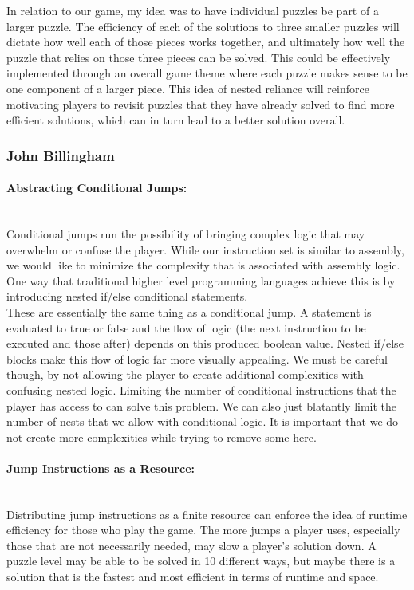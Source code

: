 In relation to our game, my idea was to have individual puzzles be part of a larger puzzle. The efficiency of each
of the solutions to three smaller puzzles will dictate how well each of those pieces works together, and ultimately
how well the puzzle that relies on those three pieces can be solved. This could be effectively implemented through
an overall game theme where each puzzle makes sense to be one component of a larger piece. This idea of nested
reliance will reinforce motivating players to revisit puzzles that they have already solved to find more efficient solutions,
which can in turn lead to a better solution overall.\\



\subsubsection{John Billingham}
\paragraph{Abstracting Conditional Jumps:} ~\\
Conditional jumps run the possibility of bringing complex logic that may overwhelm
or confuse the player. While our instruction set is similar to assembly, we would like
to minimize the complexity that is associated with assembly logic. One way that traditional
higher level programming languages achieve this is by introducing nested if/else conditional
statements.\\

These are essentially the same thing as a conditional jump. A statement is evaluated to
true or false and the flow of logic (the next instruction to be executed and those after)
depends on this produced boolean value. Nested if/else blocks make this flow of logic
far more visually appealing. We must be careful though, by not allowing the player to create
additional complexities with confusing nested logic. Limiting the number of conditional
instructions that the player has access to can solve this problem. We can also just blatantly
limit the number of nests that we allow with conditional logic. It is important that we
do not create more complexities while trying to remove some here.\\

\paragraph{Jump Instructions as a Resource:} ~\\
Distributing jump instructions as a finite resource can enforce the idea of runtime
efficiency for those who play the game. The more jumps a player uses, especially those
that are not necessarily needed, may slow a player's solution down. A puzzle level may
be able to be solved in 10 different ways, but maybe there is a solution that is the fastest
and most efficient in terms of runtime and space.\\

